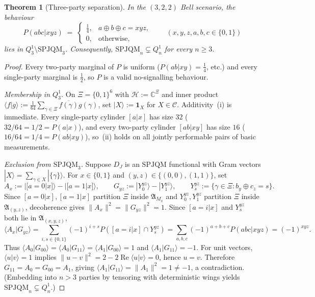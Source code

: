 \documentclass[11pt,a4paper]{article}
\newtheorem{theorem}{Theorem}[section]
\theoremstyle{definition}
\theoremstyle{remark}
\newcommand{\HH}{\mathcal{H}}
\newcommand{\cC}{\mathcal{C}}
\newcommand{\EA}{\mathfrak{A}}
\newcommand{\SPJQM}{\mathrm{SPJQM}}
\newcommand{\Qone}{Q^{1}}
\newcommand{\ket}[1]{|#1\rangle}
\newcommand{\braket}[2]{\langle #1 | #2 \rangle}
\newcommand{\norm}[1]{\|#1\|}
\begin{document}
\begin{theorem}[Three-party separation]
\label{thm:3party-counter}
In the $(3,2,2)$ Bell scenario, the behaviour
\[
P(abc|xyz) \;=\; \begin{cases} \tfrac{1}{4}, & a \oplus b \oplus c = x y z, \\ 0, & \text{otherwise,} \end{cases}
\qquad (x,y,z,a,b,c \in \{0,1\})
\]
lies in $\Qone_3 \setminus \SPJQM_3$. Consequently, $\SPJQM_n \subsetneq \Qone_n$ for every $n \ge 3$.
\end{theorem}

\begin{proof}
Every two-party marginal of $P$ is uniform ($P(ab|xy) = \tfrac{1}{4}$, etc.) and every single-party marginal is $\tfrac{1}{2}$, so $P$ is a valid no-signalling behaviour.

\emph{Membership in $\Qone_3$.} On $\Xi = \{0,1\}^6$ with $\HH := \mathbb{C}^{\Xi}$ and inner product $\braket{f}{g} := \tfrac{1}{64}\sum_{\gamma \in \Xi}\overline{f(\gamma)}g(\gamma)$, set $\ket{X} := \mathbf{1}_X$ for $X \in \cC$. Additivity~(i) is immediate. Every single-party cylinder $[a|x]$ has size $32$ ($32/64 = 1/2 = P(a|x)$), and every two-party cylinder $[ab|xy]$ has size $16$ ($16/64 = 1/4 = P(ab|xy)$), so~(ii) holds on all jointly performable pairs of basic measurements.

\emph{Exclusion from $\SPJQM_3$.} Suppose $D_J$ is an $\SPJQM$ functional with Gram vectors $\ket{X} = \sum_{\gamma \in X}\ket{\{\gamma\}}$. For $x \in \{0,1\}$ and $(y,z) \in \{(0,0),(1,1)\}$, set
\[
A_x := \ket{[a=0|x]} - \ket{[a=1|x]}, \qquad G_{yz} := \ket{Y^{yz}_0} - \ket{Y^{yz}_1}, \qquad Y^{yz}_s := \{\gamma \in \Xi : b_y \oplus c_z = s\}.
\]
Since $[a=0|x],[a=1|x]$ partition $\Xi$ inside $\EA_{M_x}$ and $Y^{yz}_0, Y^{yz}_1$ partition $\Xi$ inside $\EA_{(y,z)}$, decoherence gives $\norm{A_x}^2 = \norm{G_{yz}}^2 = 1$. Since $[a=i|x]$ and $Y^{yz}_s$ both lie in $\EA_{(x,y,z)}$,
\[
\braket{A_x}{G_{yz}} = \sum_{i,s \in \{0,1\}} (-1)^{i+s} P([a=i|x] \cap Y^{yz}_s) = \sum_{a,b,c} (-1)^{a+b+c} P(abc|xyz) = (-1)^{xyz}.
\]
Thus $\braket{A_0}{G_{00}} = \braket{A_0}{G_{11}} = \braket{A_1}{G_{00}} = 1$ and $\braket{A_1}{G_{11}} = -1$. For unit vectors, $\braket{u}{v} = 1$ implies $\norm{u-v}^2 = 2 - 2\operatorname{Re}\braket{u}{v} = 0$, hence $u = v$. Therefore $G_{11} = A_0 = G_{00} = A_1$, giving $\braket{A_1}{G_{11}} = \norm{A_1}^2 = 1 \neq -1$, a contradiction. (Embedding into $n > 3$ parties by tensoring with deterministic wings yields $\SPJQM_n \subsetneq \Qone_n$.)
\end{proof}
\end{document}
